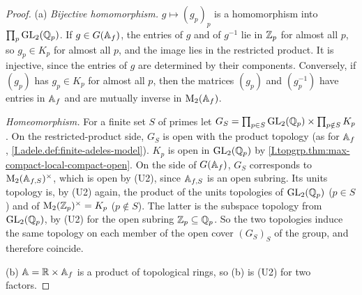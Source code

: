 \begin{theorem}
\end{theorem}
\begin{proof}
(a) \emph{Bijective homomorphism.} $g\mapsto(g_p)_p$ is a homomorphism into $\prod_p\mathrm{GL}_2(\mathbb{Q}_p)$. If $g\in G(\mathbb{A}_f)$, the
entries of $g$ and of $g^{-1}$ lie in $\mathbb{Z}_p$ for almost all $p$, so $g_p\in K_p$ for almost all $p$, and the image lies
in the restricted product. It is injective, since the entries of $g$ are determined by their components. Conversely,
if $(g_p)$ has $g_p\in K_p$ for almost all $p$, then the matrices $(g_p)$ and $(g_p^{-1})$ have entries in $\mathbb{A}_f$ and are
mutually inverse in $\mathrm{M}_2(\mathbb{A}_f)$.

\emph{Homeomorphism.} For a finite set $S$ of primes let $G_S=\prod_{p\in S}\mathrm{GL}_2(\mathbb{Q}_p)\times\prod_{p\notin S}K_p$.
On the restricted-product side, $G_S$ is open with the product topology (as for $\mathbb{A}_f$, \cref{I.adele.def:finite-adeles-model}).
$K_p$ is open in $\mathrm{GL}_2(\mathbb{Q}_p)$ by \cref{I.topgrp.thm:max-compact-local-compact-open}. On the side of $G(\mathbb{A}_f)$, $G_S$
corresponds to $\mathrm{M}_2(\mathbb{A}_{f,S})^\times$, which is open by (U2), since $\mathbb{A}_{f,S}$ is an open subring. Its units
topology is, by (U2) again, the product of the units topologies of $\mathrm{GL}_2(\mathbb{Q}_p)$ ($p\in S$) and of
$\mathrm{M}_2(\mathbb{Z}_p)^\times=K_p$ ($p\notin S$). The latter is the subspace topology from $\mathrm{GL}_2(\mathbb{Q}_p)$, by (U2) for the open
subring $\mathbb{Z}_p\subseteq\mathbb{Q}_p$. So the two topologies induce the same topology on each member of the open cover
$(G_S)_S$ of the group, and therefore coincide.

(b) $\mathbb{A}=\mathbb{R}\times\mathbb{A}_f$ is a product of topological rings, so (b) is (U2) for two factors.
\end{proof}

